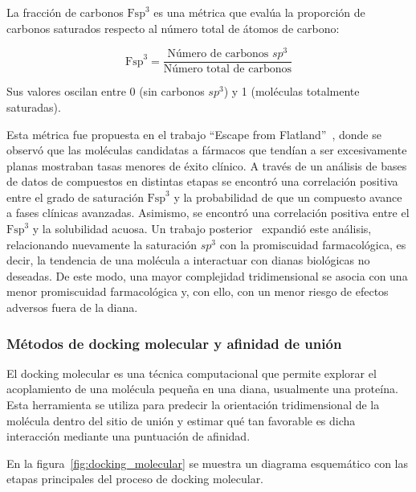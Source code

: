 La fracción de carbonos $\text{Fsp}^3$ es una métrica que evalúa la proporción de carbonos saturados respecto al número total de átomos de carbono:

\begin{equation}
\label{eq:fsp3}
\text{Fsp}^3 = \frac{\text{Número de carbonos } sp^3}{\text{Número total de carbonos}}
\end{equation}

Sus valores oscilan entre 0 (sin carbonos $sp^3$) y 1 (moléculas totalmente saturadas).

Esta métrica fue propuesta en el trabajo ``Escape from Flatland''~\cite{Lovering2009Flatland}, donde se observó que las moléculas candidatas a fármacos que tendían a ser excesivamente planas mostraban tasas menores de éxito clínico. A través de un análisis de bases de datos de compuestos en distintas etapas se encontró una correlación positiva entre el grado de saturación $\text{Fsp}^3$ y la probabilidad de que un compuesto avance a fases clínicas avanzadas. Asimismo, se encontró una correlación positiva entre el $\text{Fsp}^3$ y la solubilidad acuosa. Un trabajo posterior~\cite{Lovering2013Flatland2} expandió este análisis, relacionando nuevamente la saturación $sp^3$ con la promiscuidad farmacológica, es decir, la tendencia de una molécula a interactuar con dianas biológicas no deseadas. De este modo, una mayor complejidad tridimensional se asocia con una menor promiscuidad farmacológica y, con ello, con un menor riesgo de efectos adversos fuera de la diana.

\subsubsection{Métodos de docking molecular y afinidad de unión}
\label{subsec:docking}

El docking molecular es una técnica computacional que permite explorar el acoplamiento de una molécula pequeña en una diana, usualmente una proteína. Esta herramienta se utiliza para predecir la orientación tridimensional de la molécula dentro del sitio de unión y estimar qué tan favorable es dicha interacción mediante una puntuación de afinidad.

En la figura~\ref{fig:docking_molecular} se muestra un diagrama esquemático con las etapas principales del proceso de docking molecular.



